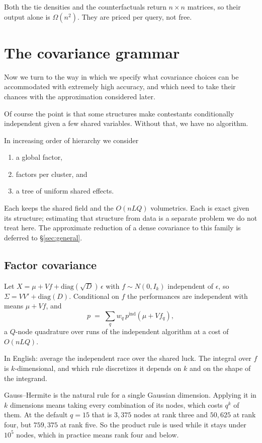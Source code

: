 \documentclass[11pt]{article}
\begin{document}
Both the tie densities and the counterfactuals return $n\times n$ matrices, so their output alone is
$\Omega(n^2)$. They are priced per query, not free.

\section{The covariance grammar}\label{sec:grammar}

Now we turn to the way in which we specify what covariance choices can be accommodated with extremely high accuracy, and which need to take their chances with the approximation considered later.

Of course the point is that some structures make contestants conditionally independent given a few
shared variables. Without that, we have no algorithm.

In increasing order of hierarchy we consider
\begin{enumerate}
\item a global factor,
\item factors per cluster, and
\item a tree of uniform shared effects.
\end{enumerate}
Each keeps the shared
field and the $O(nLQ)$ volumetrics. Each is exact given its structure;
estimating that structure from data is a separate problem we do not treat
here. The approximate reduction of a dense covariance to this family is deferred to \S\ref{sec:general}.

\subsection{Factor covariance}\label{sec:factor}

Let $X=\mu+Vf+\mathrm{diag}(\sqrt D)\,\epsilon$ with $f\sim N(0,I_k)$
independent of $\epsilon$, so $\Sigma=VV'+\mathrm{diag}(D)$. Conditional on $f$
the performances are independent with means $\mu+Vf$, and
\begin{equation}
p \;=\; \sum_q w_q\, p^{\mathrm{ind}}(\mu+Vf_q),
\end{equation}
a $Q$-node quadrature over runs of the independent algorithm at a cost of
$O(nLQ)$.

In English: average the independent race over the shared luck. The
integral over $f$ is $k$-dimensional, and which rule discretizes it
depends on $k$ and on the shape of the integrand.

Gauss--Hermite is the natural rule for a single Gaussian dimension.
Applying it in $k$ dimensions means taking every combination of its
nodes, which costs $q^{k}$ of them. At the default $q=15$ that is
$3{,}375$ nodes at rank three and $50{,}625$ at rank four, but
$759{,}375$ at rank five. So the product rule is used while it stays
under $10^{5}$ nodes, which in practice means rank four and below.
\end{document}
